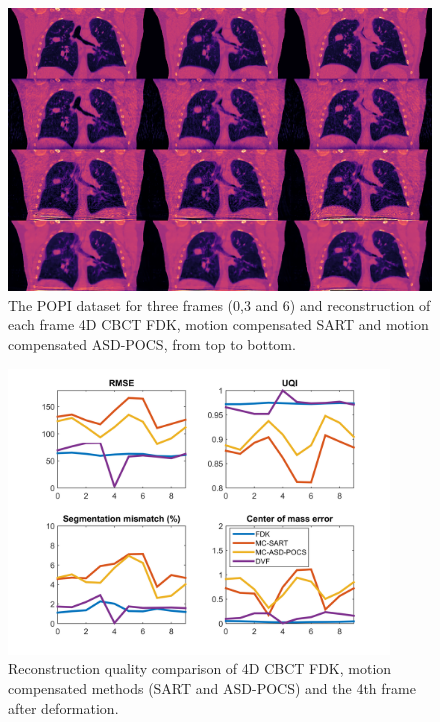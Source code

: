 \begin{figure}
\begin{center}

\includegraphics[width=\textwidth]{accuracyMC/MCCBCT3stage.png} 


\end{center}

\caption[Three frames of the motion compensated CBCT recosntruction with different algorithm]{\label{fig:MCCBCT3static} The POPI dataset for three frames (0,3 and 6) and reconstruction of each frame 4D CBCT FDK, motion compensated SART and motion compensated ASD-POCS, from top to bottom.} 
\end{figure}

\begin{figure}
\begin{center}

\includegraphics[width=0.9\textwidth]{accuracyMC/MCCBCTparams.png} 


\end{center}

\caption[Recustruction quality comparison of motioc compesnation]{\label{fig:MCCBCTquality} Reconstruction quality comparison of 4D CBCT FDK, motion compensated methods (SART and ASD-POCS) and the 4th frame after deformation.} 
\end{figure}

